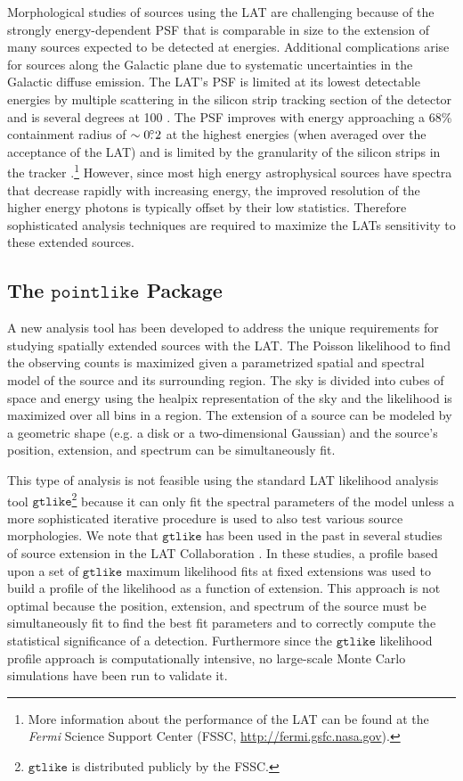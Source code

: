 \documentclass[12pt,preprint]{aastex}
\newcommand{\mev}{\text{MeV}\xspace}
\newcommand{\gev}{\text{GeV}\xspace}
\newcommand{\fermi}{\textit{Fermi}\xspace}
\newcommand{\gtlike}{\ensuremath{\mathtt{gtlike}}\xspace}
\newcommand{\pointlike}{\ensuremath{\mathtt{pointlike}}\xspace}
\begin{document}
Morphological studies of sources using the LAT are challenging
because of the strongly energy-dependent PSF that is comparable in
size to the extension of many sources expected to be detected at
\gev energies.  Additional complications arise for sources along
the Galactic plane due to systematic uncertainties in the Galactic
diffuse emission.  The LAT's PSF is limited at its lowest detectable
energies by multiple scattering in the silicon strip tracking section
of the detector and is several degrees at 100 \mev.  The PSF improves
with energy approaching a 68\% containment radius of $\sim0\mbox{$.\!\!^\circ$}2$ at
the highest energies (when averaged over the acceptance of the LAT)
and is limited by the granularity of the silicon strips in the tracker
\citep{atwood_LAT_mission,on_orbit_calibration,lat_on_orbit_psf}.\footnote{More
information about the performance of the LAT can be found at the \fermi
Science Support Center (FSSC, \url{http://fermi.gsfc.nasa.gov}).} However,
since most high energy astrophysical sources have spectra that decrease
rapidly with increasing energy, the improved resolution of the higher
energy photons is typically offset by their low statistics. Therefore sophisticated
analysis techniques are required to maximize the LATs sensitivity
to these extended sources.

\subsection{The \pointlike Package}

A new analysis tool has been developed to address the unique requirements
for studying spatially extended sources with the LAT.
The Poisson likelihood to find
the observing counts is maximized given a parametrized spatial and
spectral model of the source and its surrounding region.  The sky is
divided into cubes of space and energy using the healpix representation
of the sky \citep{healpix} and the likelihood is maximized over all bins
in a region.  The extension of a source can be modeled by a geometric
shape (e.g. a disk or a two-dimensional Gaussian) and the source's position, extension,
and spectrum can be simultaneously fit.

This type of analysis is not feasible using the standard LAT likelihood
analysis tool \gtlike\footnote{\gtlike is distributed publicly by the
FSSC.} because it can only fit the spectral parameters of the model
unless a more sophisticated iterative procedure is used to also test
various source morphologies.  We note that \gtlike has been used in the
past in several studies of source extension in the LAT Collaboration
\citep{lmc,smc,w28,w51c}.  In these studies, a profile based upon a
set of \gtlike maximum likelihood fits at fixed extensions was used
to build a profile of the likelihood as a function of extension.
This approach is not optimal because the position, extension, and
spectrum of the source must be simultaneously fit to find the best fit
parameters and to correctly compute the statistical significance of
a detection.  Furthermore since the \gtlike likelihood profile approach
is computationally intensive, no large-scale Monte Carlo simulations
have been run to validate it.
\end{document}
